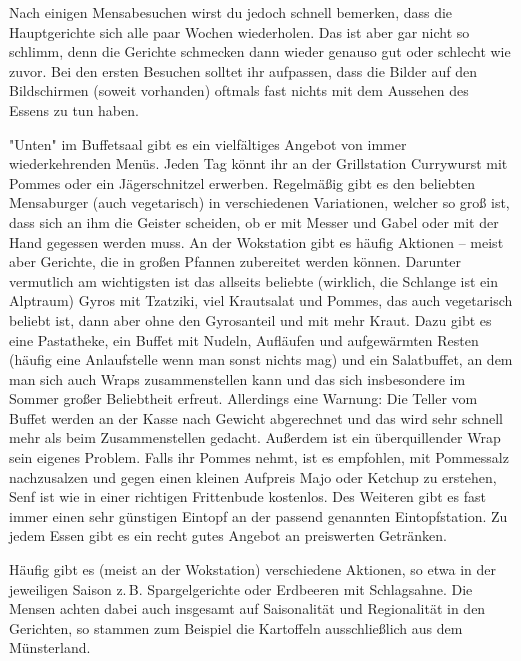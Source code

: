 \begin{multicols}{2}
Nach einigen Mensabesuchen wirst du jedoch schnell bemerken, dass die Hauptgerichte sich alle paar Wochen wiederholen.
Das ist aber gar nicht so schlimm, denn die Gerichte schmecken dann wieder genauso gut oder schlecht wie zuvor.
Bei den ersten Besuchen solltet ihr aufpassen, dass die Bilder auf den Bildschirmen (soweit vorhanden) oftmals fast nichts mit dem Aussehen des Essens zu tun haben.


"Unten" im Buffetsaal gibt es ein vielfältiges Angebot von immer wiederkehrenden Menüs.
Jeden Tag könnt ihr an der Grillstation Currywurst mit Pommes oder ein Jägerschnitzel erwerben.
Regelmäßig gibt es den beliebten Mensaburger (auch vegetarisch) in verschiedenen Variationen, welcher so groß ist, dass sich an ihm die Geister scheiden, ob er mit Messer und Gabel oder mit der Hand gegessen werden muss.
An der Wokstation gibt es häufig Aktionen – meist aber Gerichte, die in großen Pfannen zubereitet werden können. Darunter vermutlich am wichtigsten ist das allseits beliebte (wirklich, die Schlange ist ein Alptraum) Gyros mit Tzatziki, viel Krautsalat und Pommes, das auch vegetarisch beliebt ist, dann aber ohne den Gyrosanteil und mit mehr Kraut.
Dazu gibt es eine Pastatheke, ein Buffet mit Nudeln, Aufläufen und aufgewärmten Resten (häufig eine Anlaufstelle wenn man sonst nichts mag) und ein Salatbuffet, an dem man sich auch Wraps zusammenstellen kann und das sich insbesondere im Sommer großer Beliebtheit erfreut. Allerdings eine Warnung: Die Teller vom Buffet werden an der Kasse nach Gewicht abgerechnet und das wird sehr schnell mehr als beim Zusammenstellen gedacht. Außerdem ist ein überquillender Wrap sein eigenes Problem.
Falls ihr Pommes nehmt, ist es empfohlen, mit Pommessalz nachzusalzen und gegen einen kleinen Aufpreis Majo oder Ketchup zu erstehen, Senf ist wie in einer richtigen Frittenbude kostenlos.
Des Weiteren gibt es fast immer einen sehr günstigen Eintopf an der passend genannten Eintopfstation.
Zu jedem Essen gibt es ein recht gutes Angebot an preiswerten Getränken.

Häufig gibt es (meist an der Wokstation) verschiedene Aktionen, so etwa in der jeweiligen Saison z.\,B. Spargelgerichte oder Erdbeeren mit Schlagsahne. Die Mensen achten dabei auch insgesamt auf Saisonalität und Regionalität in den Gerichten, so stammen zum Beispiel die Kartoffeln ausschließlich aus dem Münsterland.


\end{multicols}
